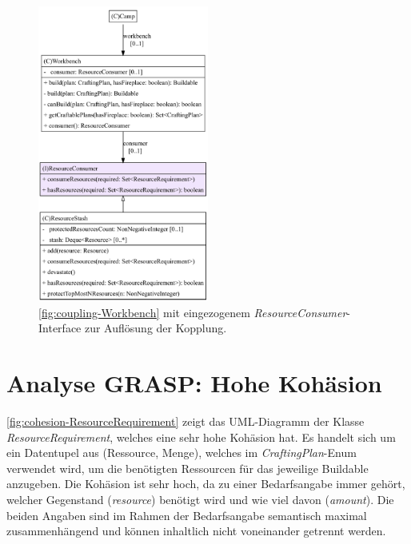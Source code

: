 \begin{figure}[H]
	\centering
	\includegraphics[width=0.5\textwidth]{Bilder/Workbench_fixed_structure.pdf} 
	\caption{\autoref{fig:coupling-Workbench} mit eingezogenem \textit{ResourceConsumer}-Interface 
	zur Auflösung der Kopplung.}
	\label{fig:coupling-Workbench-fixed}
\end{figure} 

\section{Analyse GRASP: Hohe Kohäsion}

\autoref{fig:cohesion-ResourceRequirement} zeigt das UML-Diagramm der Klasse \textit{ResourceRequirement}, 
welches eine sehr hohe Kohäsion hat. Es handelt sich um ein Datentupel aus (Ressource, Menge), 
welches im \textit{CraftingPlan}-Enum verwendet wird, um die benötigten Ressourcen für das jeweilige 
Buildable anzugeben. Die Kohäsion ist sehr hoch, da zu einer Bedarfsangabe immer gehört, welcher Gegenstand 
(\textit{resource}) benötigt wird und wie viel davon (\textit{amount}). Die beiden Angaben sind im Rahmen der 
Bedarfsangabe semantisch maximal zusammenhängend und können inhaltlich nicht voneinander getrennt werden.   

